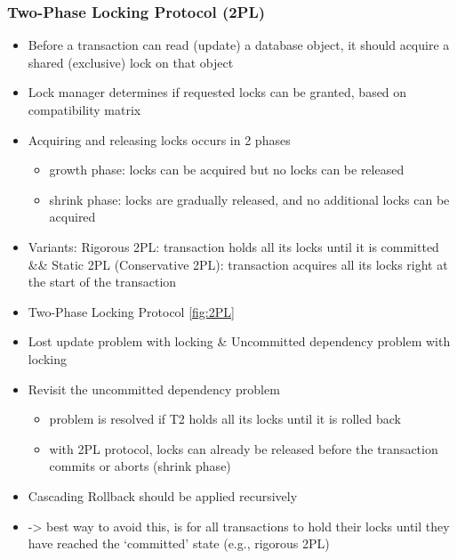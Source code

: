 \documentclass{report}
\begin{document}
    \subsubsection{Two-Phase Locking Protocol (2PL)}
    \begin{itemize}
        \item Before a transaction can read (update) a database object, it should acquire a shared (exclusive) lock on that object
        \item Lock manager determines if requested locks can be granted, based on compatibility matrix
        \item Acquiring and releasing locks occurs in 2 phases
        \begin{itemize}
            \item growth phase: locks can be acquired but no locks can be released
            \item shrink phase: locks are gradually released, and no additional locks can be acquired
        \end{itemize}
        \item Variants: Rigorous 2PL: transaction holds all its locks until it is committed \&\& Static 2PL (Conservative 2PL): transaction acquires all its locks right at the start of the transaction
        \item Two-Phase Locking Protocol \ref{fig:2PL}
        \item Lost update problem with locking \& Uncommitted dependency problem with locking
        \item Revisit the uncommitted dependency problem
        \begin{itemize}
            \item problem is resolved if T2 holds all its locks until it is rolled back
            \item with 2PL protocol, locks can already be released before the transaction commits or aborts (shrink phase)
        \end{itemize}
    \item Cascading Rollback should be applied recursively
    \item -> best way to avoid this, is for all transactions to hold their locks until they have reached the ‘committed’ state (e.g., rigorous 2PL)
    \end{itemize}
\end{document}

